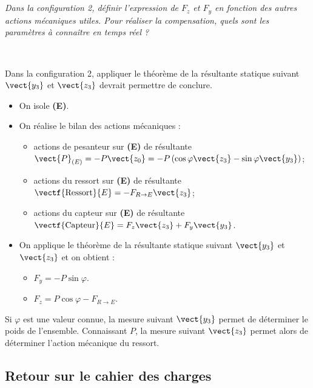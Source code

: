 \begin{multicols}{2}
\fi
\subparagraph{}
\textit{Dans la configuration 2, définir l’expression de $F_z$ et $F_y$ en fonction des autres actions mécaniques utiles. Pour réaliser la compensation, quels sont les paramètres à connaître en temps réel ?}
\ifprof
\begin{corrige} ~\\

\begin{methode}
Dans la configuration 2, appliquer le théorème de la résultante statique suivant $\vect{y_3}$ et $\vect{z_3}$ devrait permettre de conclure. 
\end{methode}
\begin{itemize}
\item On isole \textbf{(E)}.
\item On réalise le bilan des actions mécaniques : 
\begin{itemize}
\item actions de pesanteur sur \textbf{(E)} de résultante $\vect{P}_{(E)}=-P\vect{z_0}=-P\left(\cos\varphi  \vect{z_3}-\sin\varphi  \vect{y_3}\right)$;
\item actions du ressort sur \textbf{(E)} de résultante $\vectf{\text{Ressort}}{E}=-F_{R\to E} \vect{z_3}$;
\item actions du capteur sur \textbf{(E)} de résultante $\vectf{\text{Capteur}}{E}=F_z\vect{z_3}+F_y\vect{y_3}$.
\end{itemize}
\item On applique le théorème de la résultante statique suivant $\vect{y_3}$ et $\vect{z_3}$ et on obtient : 
\begin{itemize}
\item $F_y = -P\sin\varphi $. 
\item $F_z = P\cos\varphi  - F_{R\to E}$. 
\end{itemize}
\end{itemize}
Si $\varphi$ est une valeur connue, la mesure suivant $\vect{y_3}$ permet de déterminer le poids de l'ensemble. Connaissant $P$, la mesure suivant $\vect{z_3}$ permet alors de déterminer l'action mécanique du ressort. 
\end{corrige}
\else
\fi



\subsection*{Retour sur le cahier des charges}
\ifprof
\else



\end{multicols}
